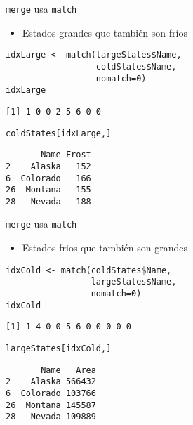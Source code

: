 \documentclass[xcolor={usenames,svgnames,dvipsnames}]{beamer}
\begin{document}
\begin{frame}[fragile,label={sec:orgf80ccec}]{\texttt{merge} usa \texttt{match}}
 \begin{itemize}
\item Estados grandes que también son fríos
\end{itemize}
\lstset{language=r,label= ,caption= ,captionpos=b,numbers=none}
\begin{lstlisting}
idxLarge <- match(largeStates$Name,
                  coldStates$Name,
                  nomatch=0)
idxLarge
\end{lstlisting}

\begin{verbatim}
[1] 1 0 0 2 5 6 0 0
\end{verbatim}

\lstset{language=r,label= ,caption= ,captionpos=b,numbers=none}
\begin{lstlisting}
coldStates[idxLarge,]
\end{lstlisting}

\begin{verbatim}
       Name Frost
2    Alaska   152
6  Colorado   166
26  Montana   155
28   Nevada   188
\end{verbatim}
\end{frame}

\begin{frame}[fragile,label={sec:org39518aa}]{\texttt{merge} usa \texttt{match}}
 \begin{itemize}
\item Estados frios que también son grandes
\end{itemize}
\lstset{language=r,label= ,caption= ,captionpos=b,numbers=none}
\begin{lstlisting}
idxCold <- match(coldStates$Name,
                 largeStates$Name,
                 nomatch=0)
idxCold
\end{lstlisting}

\begin{verbatim}
[1] 1 4 0 0 5 6 0 0 0 0 0
\end{verbatim}

\lstset{language=r,label= ,caption= ,captionpos=b,numbers=none}
\begin{lstlisting}
largeStates[idxCold,]
\end{lstlisting}

\begin{verbatim}
       Name   Area
2    Alaska 566432
6  Colorado 103766
26  Montana 145587
28   Nevada 109889
\end{verbatim}
\end{frame}
\end{document}
